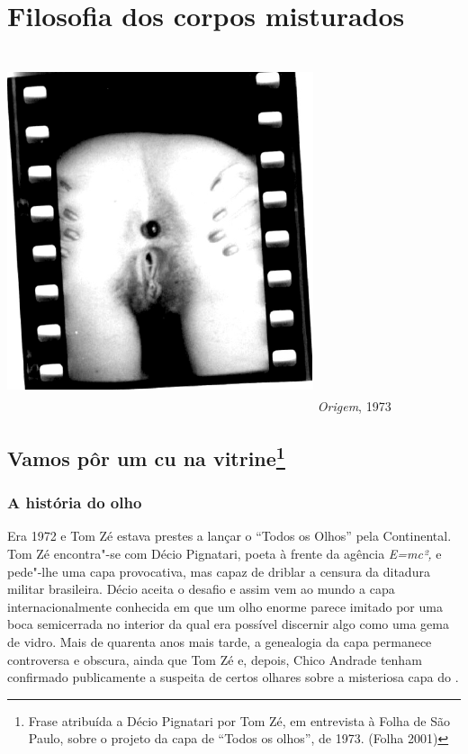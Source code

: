 \chapter{Filosofia dos corpos misturados}

\begin{center}
\includegraphics[width=9cm,height=10.6cm]{Imgs/img6.jpg}
\emph{Origem}, 1973
\end{center}

\section*{Vamos pôr um cu na vitrine\protect\footnote{Frase
  atribuída a Décio Pignatari por Tom Zé, em entrevista à Folha
  de São Paulo, sobre o projeto da capa de ``Todos os olhos'',
  de 1973. (Folha 2001)}}

\subsection{A história do olho}

Era 1972 e Tom Zé estava prestes a lançar o
 ``Todos os Olhos'' pela Continental. Tom Zé encontra"-se com Décio
Pignatari, poeta à frente da agência \emph{E=mc²,} e pede"-lhe uma capa
provocativa, mas capaz de driblar a censura da ditadura militar
brasileira. Décio aceita o desafio e assim vem ao mundo a capa
internacionalmente conhecida em que um olho enorme parece imitado por
uma boca semicerrada no interior da qual era possível discernir algo
como uma gema de vidro. Mais de quarenta anos mais tarde, a genealogia
da capa permanece controversa e obscura, ainda que Tom Zé e, depois,
Chico Andrade tenham confirmado publicamente a suspeita de certos
olhares sobre a misteriosa capa do .

